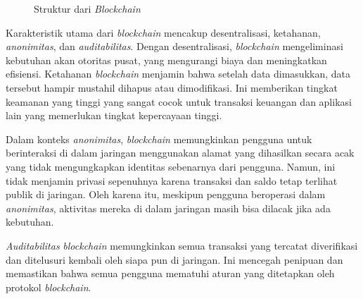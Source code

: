 \begin{figure} [H] \centering
    \caption{Struktur dari \emph{Blockchain} \cite{Zheng2020}}
    \label{fig:blockchain}
    \end{figure}

Karakteristik utama dari \emph{blockchain} mencakup desentralisasi, ketahanan, \emph{anonimitas}, dan \emph{auditabilitas}. Dengan desentralisasi, \emph{blockchain} mengeliminasi kebutuhan akan otoritas pusat, yang mengurangi biaya dan meningkatkan efisiensi. Ketahanan \emph{blockchain} menjamin bahwa setelah data dimasukkan, data tersebut hampir mustahil dihapus atau dimodifikasi. Ini memberikan tingkat keamanan yang tinggi yang sangat cocok untuk transaksi keuangan dan aplikasi lain yang memerlukan tingkat kepercayaan tinggi.

Dalam konteks \emph{anonimitas}, \emph{blockchain} memungkinkan pengguna untuk berinteraksi di dalam jaringan menggunakan alamat yang dihasilkan secara acak yang tidak mengungkapkan identitas sebenarnya dari pengguna. Namun, ini tidak menjamin privasi sepenuhnya karena transaksi dan saldo tetap terlihat publik di jaringan. Oleh karena itu, meskipun pengguna beroperasi dalam \emph{anonimitas}, aktivitas mereka di dalam jaringan masih bisa dilacak jika ada kebutuhan.

\emph{Auditabilitas} \emph{blockchain} memungkinkan semua transaksi yang tercatat diverifikasi dan ditelusuri kembali oleh siapa pun di jaringan. Ini mencegah penipuan dan memastikan bahwa semua pengguna mematuhi aturan yang ditetapkan oleh protokol \emph{blockchain}.

